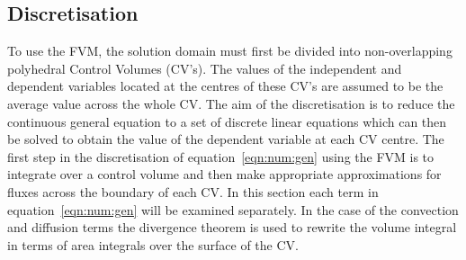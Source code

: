 \subsection{Discretisation}

To use the FVM, the solution domain must first be divided into
non-overlapping polyhedral Control Volumes (CV's). The values of the
independent and dependent variables located at the centres of these
CV's are assumed to be the average value across the whole CV.  The aim
of the discretisation is to reduce the continuous general equation to
a set of discrete linear equations which can then be solved to obtain
the value of the dependent variable at each CV centre.  The first step
in the discretisation of equation~\eqref{eqn:num:gen} using the FVM is
to integrate over a control volume and then make appropriate
approximations for fluxes across the boundary of each CV.  In this
section each term in equation~\eqref{eqn:num:gen} will be examined
separately. In the case of the convection and diffusion terms the
divergence theorem is used to rewrite the volume integral in terms of
area integrals over the surface of the CV.
